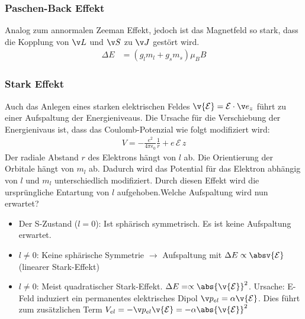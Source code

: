 \documentclass[twocolumn]{summery_4.1}
\begin{document}
\subsubsection{Paschen-Back Effekt}
Analog zum annormalen Zeeman Effekt, jedoch ist das Magnetfeld so stark, dass die Kopplung von \(\v L\) und \(\v S\) zu \(\v J\) gestört wird. 
\begin{align*}
    \Delta E &= (g_l m_l + g_s m_s) \mu_B B 
\end{align*}

\subsubsection{Stark Effekt}
Auch das Anlegen eines starken elektrischen Feldes \(\v {\mathcal E} = \mathcal E \cdot \v e_z  \) führt zu einer Aufspaltung der Energieniveaus. Die Ursache für die Verschiebung der Energienivaus ist, dass das Coulomb-Potenzial wie folgt modifiziert wird:
\begin{align*}
    V=-\frac{e^2}{4\pi\epsilon_0} \frac1r + e\,\mathcal E \,z 
\end{align*}
Der radiale Abstand $r$ des Elektrons hängt von $l$ ab. Die Orientierung der Orbitale hängt von $m_l$ ab. Dadurch wird das Potential für das Elektron abhängig von $l$ und $m_l$ unterschiedlich modifiziert. Durch diesen Effekt wird die ursprüngliche Entartung von $l$ aufgehoben.Welche Aufspaltung wird nun erwartet?
\begin{itemize}
    \item Der S-Zustand (\(l=0\)): Ist sphärisch symmetrisch. Es ist keine Aufspaltung erwartet.
    \item \(l\neq0\): Keine sphärische Symmetrie \(\to\) Aufspaltung mit \(\Delta E \propto \absv{{\mathcal E}}\) (linearer Stark-Effekt)
    \item \(l\neq 0\): Meist quadratischer Stark-Effekt. \(\Delta E =\propto \abs{\v{\mathcal E}}^2\). Ursache: E-Feld induziert ein permanentes elektrisches Dipol \(\v p_{el} = \alpha \v{\mathcal E}\). Dies führt zum zusätzlichen Term \(V_{el} = - \v p_{el} \v{\mathcal E}=-\alpha \abs{\v{\mathcal E}}^2\)
\end{itemize}
\end{document}
